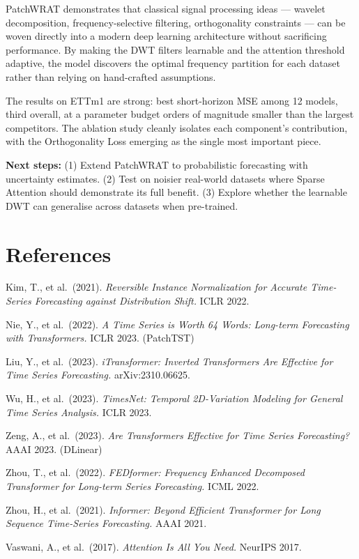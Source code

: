 \documentclass[11pt, letterpaper]{article}
\begin{document}
PatchWRAT demonstrates that classical signal processing ideas --- wavelet decomposition, frequency-selective filtering, orthogonality constraints --- can be woven directly into a modern deep learning architecture without sacrificing performance. By making the DWT filters learnable and the attention threshold adaptive, the model discovers the optimal frequency partition for each dataset rather than relying on hand-crafted assumptions.

The results on ETTm1 are strong: best short-horizon MSE among 12 models, third overall, at a parameter budget orders of magnitude smaller than the largest competitors. The ablation study cleanly isolates each component's contribution, with the Orthogonality Loss emerging as the single most important piece.

\textbf{Next steps:} (1) Extend PatchWRAT to probabilistic forecasting with uncertainty estimates. (2) Test on noisier real-world datasets where Sparse Attention should demonstrate its full benefit. (3) Explore whether the learnable DWT can generalise across datasets when pre-trained.

\section*{References}

\begin{enumerate}[label={[\arabic*]}]
  \item Kim, T., et al.\ (2021). \textit{Reversible Instance Normalization for Accurate
    Time-Series Forecasting against Distribution Shift.} ICLR 2022.
  \item Nie, Y., et al.\ (2022). \textit{A Time Series is Worth 64 Words: Long-term
    Forecasting with Transformers.} ICLR 2023. (PatchTST)
  \item Liu, Y., et al.\ (2023). \textit{iTransformer: Inverted Transformers Are Effective
    for Time Series Forecasting.} arXiv:2310.06625.
  \item Wu, H., et al.\ (2023). \textit{TimesNet: Temporal 2D-Variation Modeling for
    General Time Series Analysis.} ICLR 2023.
  \item Zeng, A., et al.\ (2023). \textit{Are Transformers Effective for Time Series
    Forecasting?} AAAI 2023. (DLinear)
  \item Zhou, T., et al.\ (2022). \textit{FEDformer: Frequency Enhanced Decomposed
    Transformer for Long-term Series Forecasting.} ICML 2022.
  \item Zhou, H., et al.\ (2021). \textit{Informer: Beyond Efficient Transformer for Long
    Sequence Time-Series Forecasting.} AAAI 2021.
  \item Vaswani, A., et al.\ (2017). \textit{Attention Is All You Need.} NeurIPS 2017.
\end{enumerate}
\end{document}
